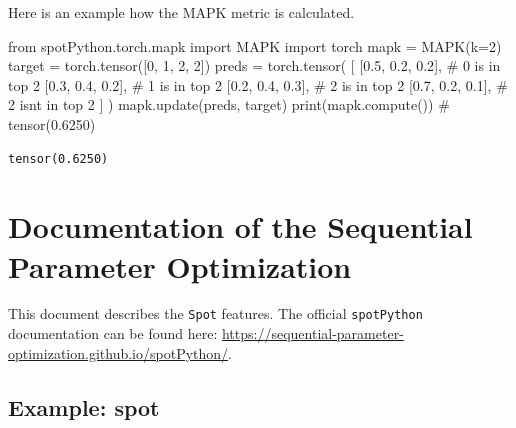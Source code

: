 \documentclass[
  letterpaper,
  DIV=11,
  numbers=noendperiod]{scrreprt}
\newenvironment{Shaded}{\begin{snugshade}}{\end{snugshade}}
\newcommand{\BuiltInTok}[1]{\textcolor[rgb]{0.00,0.23,0.31}{#1}}
\newcommand{\CommentTok}[1]{\textcolor[rgb]{0.37,0.37,0.37}{#1}}
\newcommand{\DecValTok}[1]{\textcolor[rgb]{0.68,0.00,0.00}{#1}}
\newcommand{\FloatTok}[1]{\textcolor[rgb]{0.68,0.00,0.00}{#1}}
\newcommand{\ImportTok}[1]{\textcolor[rgb]{0.00,0.46,0.62}{#1}}
\newcommand{\NormalTok}[1]{\textcolor[rgb]{0.00,0.23,0.31}{#1}}
\newcommand{\OperatorTok}[1]{\textcolor[rgb]{0.37,0.37,0.37}{#1}}
\begin{document}
Here is an example how the MAPK metric is calculated.

\begin{Shaded}
\begin{Highlighting}[]
\ImportTok{from}\NormalTok{ spotPython.torch.mapk }\ImportTok{import}\NormalTok{ MAPK}
\ImportTok{import}\NormalTok{ torch}
\NormalTok{mapk }\OperatorTok{=}\NormalTok{ MAPK(k}\OperatorTok{=}\DecValTok{2}\NormalTok{)}
\NormalTok{target }\OperatorTok{=}\NormalTok{ torch.tensor([}\DecValTok{0}\NormalTok{, }\DecValTok{1}\NormalTok{, }\DecValTok{2}\NormalTok{, }\DecValTok{2}\NormalTok{])}
\NormalTok{preds }\OperatorTok{=}\NormalTok{ torch.tensor(}
\NormalTok{    [}
\NormalTok{        [}\FloatTok{0.5}\NormalTok{, }\FloatTok{0.2}\NormalTok{, }\FloatTok{0.2}\NormalTok{],  }\CommentTok{\# 0 is in top 2}
\NormalTok{        [}\FloatTok{0.3}\NormalTok{, }\FloatTok{0.4}\NormalTok{, }\FloatTok{0.2}\NormalTok{],  }\CommentTok{\# 1 is in top 2}
\NormalTok{        [}\FloatTok{0.2}\NormalTok{, }\FloatTok{0.4}\NormalTok{, }\FloatTok{0.3}\NormalTok{],  }\CommentTok{\# 2 is in top 2}
\NormalTok{        [}\FloatTok{0.7}\NormalTok{, }\FloatTok{0.2}\NormalTok{, }\FloatTok{0.1}\NormalTok{],  }\CommentTok{\# 2 isn\textquotesingle{}t in top 2}
\NormalTok{    ]}
\NormalTok{)}
\NormalTok{mapk.update(preds, target)}
\BuiltInTok{print}\NormalTok{(mapk.compute()) }\CommentTok{\# tensor(0.6250)}
\end{Highlighting}
\end{Shaded}

\begin{verbatim}
tensor(0.6250)
\end{verbatim}

\cleardoublepage
{}
{}
\appendix

\hypertarget{documentation-of-the-sequential-parameter-optimization}{%
\chapter{Documentation of the Sequential Parameter
Optimization}\label{documentation-of-the-sequential-parameter-optimization}}

This document describes the \texttt{Spot} features. The official
\texttt{spotPython} documentation can be found here:
\url{https://sequential-parameter-optimization.github.io/spotPython/}.

\hypertarget{example-spot}{%
\section{Example: spot}\label{example-spot}}
\end{document}
